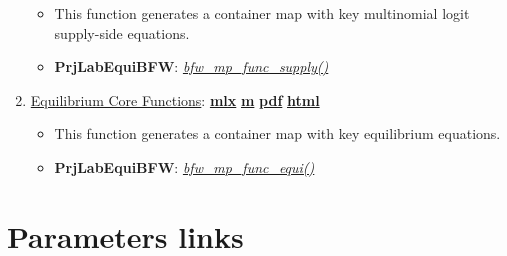 \documentclass[
]{book}
\providecommand{\tightlist}{%
  \setlength{\itemsep}{0pt}\setlength{\parskip}{0pt}}
\begin{document}
\begin{enumerate}
  \begin{itemize}
  \tightlist
  \item
    This function generates a container map with key multinomial logit supply-side equations.
  \item
    \textbf{PrjLabEquiBFW}: \emph{\href{https://github.com/FanWangEcon/PrjLabEquiBFW/blob/main/PrjLabEquiBFW/func/bfw_mp_func_supply.m}{bfw\_mp\_func\_supply()}}
  \end{itemize}
\item
  \href{https://fanwangecon.github.io/PrjLabEquiBFW/PrjLabEquiBFW/doc/func/htmlpdfm/bfwx_mp_func_equi.html}{Equilibrium Core Functions}: \href{https://github.com/FanWangEcon/PrjLabEquiBFW/blob/master/PrjLabEquiBFW/doc/func/bfwx_mp_func_equi.mlx}{\textbf{mlx}} \textbar{} \href{https://github.com/FanWangEcon/PrjLabEquiBFW/blob/master/PrjLabEquiBFW/doc/func/htmlpdfm/bfwx_mp_func_equi.m}{\textbf{m}} \textbar{} \href{https://github.com/FanWangEcon/PrjLabEquiBFW/blob/master/PrjLabEquiBFW/doc/func/htmlpdfm/bfwx_mp_func_equi.pdf}{\textbf{pdf}} \textbar{} \href{https://fanwangecon.github.io/PrjLabEquiBFW/PrjLabEquiBFW/doc/func/htmlpdfm/bfwx_mp_func_equi.html}{\textbf{html}}

  \begin{itemize}
  \tightlist
  \item
    This function generates a container map with key equilibrium equations.
  \item
    \textbf{PrjLabEquiBFW}: \emph{\href{https://github.com/FanWangEcon/PrjLabEquiBFW/blob/main/PrjLabEquiBFW/func/bfw_mp_func_equi.m}{bfw\_mp\_func\_equi()}}
  \end{itemize}
\end{enumerate}

\hypertarget{parameters-links}{%
\section{Parameters links}\label{parameters-links}}
\end{document}
